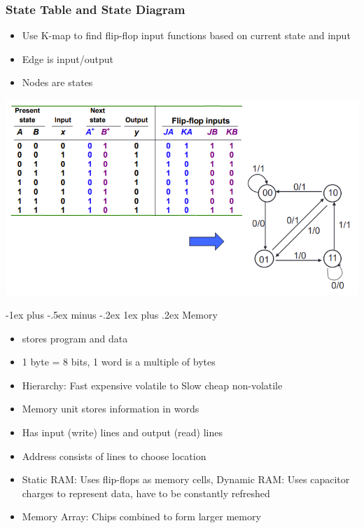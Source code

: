 \documentclass[10pt, portrait]{article}
\makeatletter
\renewcommand{\subsection}{\@startsection{subsection}{3}{0mm}%
                                {-1ex plus -.5ex minus -.2ex}%
                                {1ex plus .2ex}%
                                {\normalfont\small\bfseries}}%
\makeatother
\begin{document}
\begin{multicols*}{2}
\subsubsection{State Table and State Diagram}
\begin{itemize}
    \item Use K-map to find flip-flop input functions based on current state and input
    \item Edge is input/output
    \item Nodes are states
\end{itemize}
\begin{center}
    \includegraphics[width=\linewidth]{statediagram.png}
\end{center}

\subsection{Memory}
\begin{itemize}
    \item stores program and data
    \item 1 byte = 8 bits, 1 word is a multiple of bytes
    \item Hierarchy: Fast expensive volatile to Slow cheap non-volatile
    \item Memory unit stores information in words
    \item Has input (write) lines and output (read) lines
    \item Address consists of lines to choose location
    \item Static RAM: Uses flip-flops as memory cells, Dynamic RAM: Uses capacitor charges to represent data, have to be constantly refreshed
    \item Memory Array: Chips combined to form larger memory
\end{itemize}


\end{multicols*}
\end{document}
